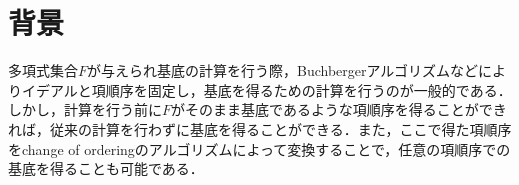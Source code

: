 \section{背景}
多項式集合$F$が与えられ\groebner{}基底の計算を行う際，Buchbergerアルゴリズムなどによりイデアルと項順序を固定し，\groebner{}基底を得るための計算を行うのが一般的である．
しかし，計算を行う前に$F$がそのまま\groebner{}基底であるような項順序を得ることができれば，従来の計算を行わずに\groebner{}基底を得ることができる．また，ここで得た項順序をchange of orderingのアルゴリズムによって変換することで，任意の項順序での\groebner{}基底を得ることも可能である．